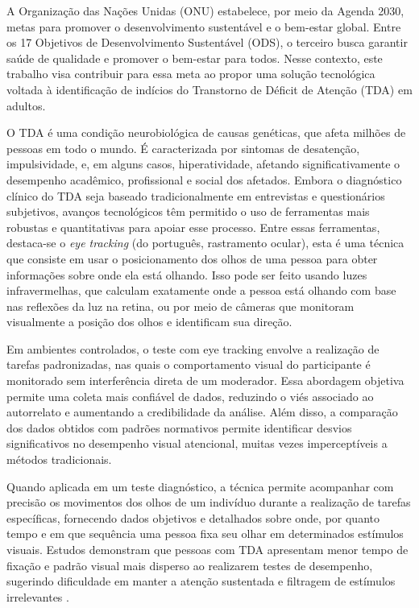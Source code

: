 A Organização das Nações Unidas (ONU) estabelece, por meio da Agenda 2030, metas para promover o desenvolvimento sustentável e o bem-estar global. Entre os 17 Objetivos de Desenvolvimento Sustentável (ODS), o terceiro busca garantir saúde de qualidade e promover o bem-estar para todos. Nesse contexto, este trabalho visa contribuir para essa meta ao propor uma solução tecnológica voltada à identificação de indícios do Transtorno de Déficit de Atenção (TDA) em adultos.\textcite{unitednations2015agenda2030}

O TDA é uma condição neurobiológica de causas genéticas, que afeta milhões de pessoas em todo o mundo. É caracterizada por sintomas de
desatenção, impulsividade, e, em alguns casos, hiperatividade, afetando significativamente o
desempenho acadêmico, profissional e social dos afetados. Embora o diagnóstico clínico do
TDA seja baseado tradicionalmente em entrevistas e questionários subjetivos, avanços
tecnológicos têm permitido o uso de ferramentas mais robustas e quantitativas para apoiar
esse processo. \textcite{BVS2014}
Entre essas ferramentas, destaca-se o \textit{eye tracking} (do português, rastramento ocular), esta é uma técnica
que consiste em usar o posicionamento dos olhos de uma pessoa para obter informações
sobre onde ela está olhando. Isso pode ser feito usando luzes infravermelhas, que calculam
exatamente onde a pessoa está olhando com base nas reflexões da luz na retina, ou por
meio de câmeras que monitoram visualmente a posição dos olhos e identificam sua direção.

Em ambientes controlados, o teste com eye tracking envolve a realização de tarefas
padronizadas, nas quais o comportamento visual do participante é monitorado sem
interferência direta de um moderador. Essa abordagem objetiva permite uma coleta mais
confiável de dados, reduzindo o viés associado ao autorrelato e aumentando a credibilidade
da análise. Além disso, a comparação dos dados obtidos com padrões normativos permite
identificar desvios significativos no desempenho visual atencional, muitas vezes
imperceptíveis a métodos tradicionais.

Quando aplicada em um teste diagnóstico, a técnica permite acompanhar com
precisão os movimentos dos olhos de um indivíduo durante a realização de tarefas
específicas, fornecendo dados objetivos e detalhados sobre onde, por quanto tempo e em
que sequência uma pessoa fixa seu olhar em determinados estímulos visuais. Estudos
demonstram que pessoas com TDA apresentam menor tempo de fixação e padrão visual
mais disperso ao realizarem testes de desempenho, sugerindo dificuldade em manter a
atenção sustentada e filtragem de estímulos irrelevantes \textcite{Lim2024}.

